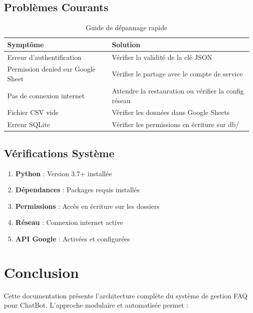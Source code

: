 \documentclass[11pt,a4paper]{article}
\begin{document}
\subsection{Problèmes Courants}
\begin{table}[H]
    \centering
    \begin{tabular}{|p{}|p{}|}
        \hline
        \textbf{Symptôme} & \textbf{Solution} \\
        \hline
        Erreur d'authentification & Vérifier la validité de la clé JSON \\
        \hline
        Permission denied sur Google Sheet & Vérifier le partage avec le compte de service \\
        \hline
        Pas de connexion internet & Attendre la restauration ou vérifier la config réseau \\
        \hline
        Fichier CSV vide & Vérifier les données dans Google Sheets \\
        \hline
        Erreur SQLite & Vérifier les permissions en écriture sur db/ \\
        \hline
    \end{tabular}
    \caption{Guide de dépannage rapide}
\end{table}

\subsection{Vérifications Système}
\begin{enumerate}
    \item \textbf{Python} : Version 3.7+ installée
    \item \textbf{Dépendances} : Packages requis installés
    \item \textbf{Permissions} : Accès en écriture sur les dossiers
    \item \textbf{Réseau} : Connexion internet active
    \item \textbf{API Google} : Activées et configurées
\end{enumerate}

\section*{Conclusion}

Cette documentation présente l'architecture complète du système de gestion FAQ pour ChatBot. L'approche modulaire et automatisée permet :
\end{document}
